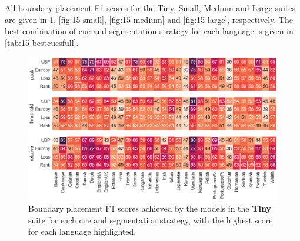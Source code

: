 All boundary placement F1 scores for the Tiny, Small, Medium and Large suites are given in \cref{fig:15-tiny}, \cref{fig:15-small}, \cref{fig:15-medium} and \cref{fig:15-large}, respectively. The best combination of cue and segmentation strategy for each language is given in \cref{tab:15-bestcuesfull}.



\begin{figure}
    \centering
    \includegraphics[width=0.99\linewidth]{Figures/15Phonology/tiny.png}
    \caption{Boundary placement F1 scores achieved by the models in the \textbf{Tiny} suite for each cue and segmentation strategy, with the highest score for each language highlighted.}
    \label{fig:15-tiny}
\end{figure}

